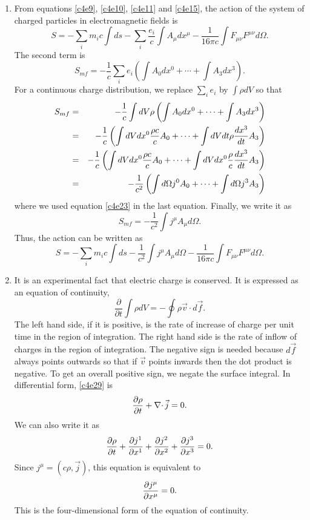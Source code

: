 \begin{enumerate}
\item From equations \eqref{c4e9}, \eqref{c4e10}, \eqref{c4e11} and 
\eqref{c4e15}, the action of the system of charged particles in 
electromagnetic fields is
\[
S = -\sum_i m_ic\int ds - 
\sum_i\frac{e_i}{c}\int A_\mu dx^\mu - \frac{1}{16\pi c}
\int F_{\mu\nu} F^{\mu\nu} d\Omega.
\]
The second term is
\[
S_{mf} = -\frac{1}{c}\sum_i e_i\left(\int A_0dx^0 + \cdots + 
\int A_3dx^3\right).
\]
For a continuous charge distribution, we replace $\sum_i e_i$ by $\int \rho dV$
so that
\begin{eqnarray*}
S_{mf} &=& -\frac{1}{c}\int dV \rho\left(\int A_0dx^0 + \cdots + 
\int A_3dx^3\right) \\
 &=& -\frac{1}{c}\left(\int dVdx^0 \frac{\rho c}{c}A_0 + \cdots + 
 \int dVdt \rho\frac{d{x^3}}{d{t}}A_3\right) \\
 &=& -\frac{1}{c}\left(\int dVdx^0 \frac{\rho c}{c}A_0 + \cdots + 
 \int dVdx^0 \frac{\rho}{c}\frac{d{x^3}}{d{t}}A_3\right) \\
 &=& -\frac{1}{c^2}\left(\int d\Omega j^0A_0 + \cdots + 
 	\int d\Omega j^3A_3\right)
\end{eqnarray*}
where we used equation \eqref{c4e23} in the last equation. Finally, we write it
as
\begin{equation}\label{c4e27}
S_{mf} = -\frac{1}{c^2}\int j^\mu A_\mu d\Omega.
\end{equation}
Thus, the action can be written as
\begin{equation}\label{c4e28}
S = -\sum_i m_ic\int ds - \frac{1}{c^2}\int j^\mu A_\mu d\Omega - 
\frac{1}{16\pi c}\int F_{\mu\nu} F^{\mu\nu} d\Omega.
\end{equation}

\item It is an experimental fact that electric charge is conserved. It is 
expressed as an equation of continuity,
\begin{equation}\label{c4e29}
\frac{\partial}{\partial t}\int\rho dV = -\oint \rho\vec{v}\cdot d\vec{f}.
\end{equation}
The left hand side, if it is positive, is the rate of increase of charge per 
unit time in the region of integration. The right hand side is the rate of 
inflow of charges in the region of integration. The negative sign is needed 
because $d\vec{f}$ always points outwards so that if $\vec{v}$ points inwards 
then the dot product is negative. To get an overall positive sign, we negate 
the surface integral. In differential form, \eqref{c4e29} is
\begin{equation}\label{c4e30}
\frac{\partial{\rho}}{\partial{t}} + \operatorname{\nabla\cdot}\vec{j} = 0.
\end{equation}
We can also write it as
\[
\frac{\partial{\rho}}{\partial{t}} + \frac{\partial{j^1}}{\partial{x^1}} + \frac{\partial{j^2}}{\partial{x^2}} + \frac{\partial{j^3}}{\partial{x^3}} = 0.
\]
Since $j^\mu = (c\rho, \vec{j})$, this equation is equivalent to
\begin{equation}\label{c4e31}
\frac{\partial{j^\mu}}{\partial{x^\mu}} = 0.
\end{equation}
This is the four-dimensional form of the equation of continuity.


\end{enumerate}
